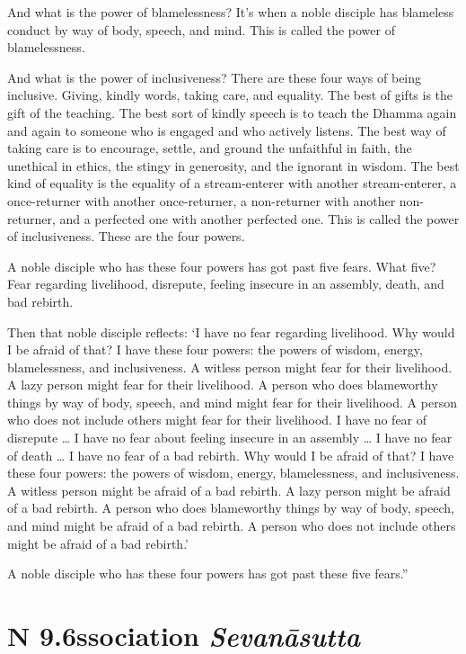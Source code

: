 \documentclass[12pt,openany]{book}%
\newcommand*{\suttatitleacronym}[1]{\smaller[2]{#1}\vspace*{.3em}}
\newcommand*{\suttatitletranslation}[1]{\linebreak{#1}}
\newcommand*{\suttatitleroot}[1]{\linebreak\smaller[2]\itshape{#1}}
\newcommand*{\tocacronym}[1]{\hspace*{-3.3em}{#1}\quad}
\newcommand*{\toctranslation}[1]{#1}
\newcommand*{\tocroot}[1]{(\textit{#1})}
\begin{document}
And what is the power of blamelessness? It’s when a noble disciple has blameless conduct by way of body, speech, and mind. This is called the power of blamelessness. 

And what is the power of inclusiveness? There are these four ways of being inclusive. Giving, kindly words, taking care, and equality. The best of gifts is the gift of the teaching. The best sort of kindly speech is to teach the Dhamma again and again to someone who is engaged and who actively listens. The best way of taking care is to encourage, settle, and ground the unfaithful in faith, the unethical in ethics, the stingy in generosity, and the ignorant in wisdom. The best kind of equality is the equality of a stream-enterer with another stream-enterer, a once-returner with another once-returner, a non-returner with another non-returner, and a perfected one with another perfected one. This is called the power of inclusiveness. These are the four powers. 

A noble disciple who has these four powers has got past five fears. What five? Fear regarding livelihood, disrepute, feeling insecure in an assembly, death, and bad rebirth. 

Then that noble disciple reflects: ‘I have no fear regarding livelihood. Why would I be afraid of that? I have these four powers: the powers of wisdom, energy, blamelessness, and inclusiveness. A witless person might fear for their livelihood. A lazy person might fear for their livelihood. A person who does blameworthy things by way of body, speech, and mind might fear for their livelihood. A person who does not include others might fear for their livelihood. I have no fear of disrepute … I have no fear about feeling insecure in an assembly … I have no fear of death … I have no fear of a bad rebirth. Why would I be afraid of that? I have these four powers: the powers of wisdom, energy, blamelessness, and inclusiveness. A witless person might be afraid of a bad rebirth. A lazy person might be afraid of a bad rebirth. A person who does blameworthy things by way of body, speech, and mind might be afraid of a bad rebirth. A person who does not include others might be afraid of a bad rebirth.’ 

A noble disciple who has these four powers has got past these five fears.” 

%
\section*{{\suttatitleacronym AN 9.6}{\suttatitletranslation Association }{\suttatitleroot Sevanāsutta}}
\addcontentsline{toc}{section}{\tocacronym{AN 9.6} \toctranslation{Association } \tocroot{Sevanāsutta}}
\end{document}
